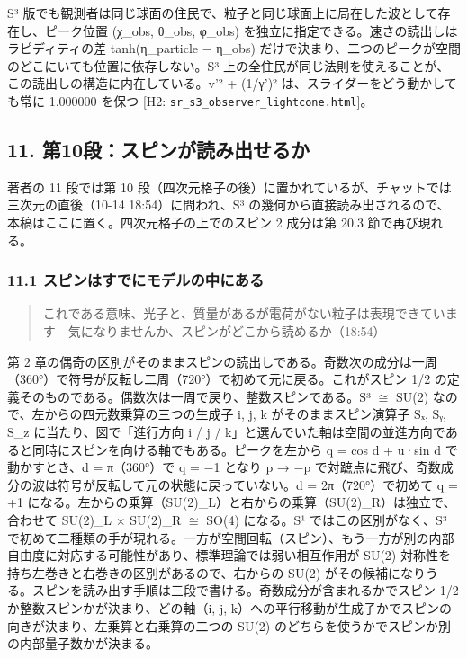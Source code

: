 \documentclass[
  a4paper,
]{ltjsarticle}
\begin{document}
S³
版でも観測者は同じ球面の住民で、粒子と同じ球面上に局在した波として存在し、ピーク位置
(χ\_obs, θ\_obs, φ\_obs)
を独立に指定できる。速さの読出しはラピディティの差 tanh(η\_particle −
η\_obs)
だけで決まり、二つのピークが空間のどこにいても位置に依存しない。S³
上の全住民が同じ法則を使えることが、この読出しの構造に内在している。v'²
+ (1/γ')² は、スライダーをどう動かしても常に 1.000000 を保つ {[}H2:
\texttt{sr\_\allowbreak{}s3\_\allowbreak{}observer\_\allowbreak{}lightcone.html}{]}。

\subsection{11.
第10段：スピンが読み出せるか}\label{ux7b2c10ux6bb5ux30b9ux30d4ux30f3ux304cux8aadux307fux51faux305bux308bux304b}

著者の 11 段では第 10
段（四次元格子の後）に置かれているが、チャットでは三次元の直後（10-14
18:54）に問われ、S³
の幾何から直接読み出されるので、本稿はここに置く。四次元格子の上でのスピン
2 成分は第 20.3 節で再び現れる。

\subsubsection{11.1
スピンはすでにモデルの中にある}\label{ux30b9ux30d4ux30f3ux306fux3059ux3067ux306bux30e2ux30c7ux30ebux306eux4e2dux306bux3042ux308b}

\begin{quote}
これである意味、光子と、質量があるが電荷がない粒子は表現できています　気になりませんか、スピンがどこから読めるか（18:54）
\end{quote}

第 2
章の偶奇の区別がそのままスピンの読出しである。奇数次の成分は一周（360°）で符号が反転し二周（720°）で初めて元に戻る。これがスピン
1/2 の定義そのものである。偶数次は一周で戻り、整数スピンである。S³
\(\cong\) SU(2) なので、左からの四元数乗算の三つの生成子 i, j, k
がそのままスピン演算子 Sₓ, Sᵧ, S\_z に当たり、図で「進行方向 i / j /
k」と選んでいた軸は空間の並進方向であると同時にスピンを向ける軸でもある。ピークを左から
q = cos d + u·sin d で動かすとき、d = π（360°）で q = −1 となり p → −p
で対蹠点に飛び、奇数成分の波は符号が反転して元の状態に戻っていない。d =
2π（720°）で初めて q = +1
になる。左からの乗算（SU(2)\_L）と右からの乗算（SU(2)\_R）は独立で、合わせて
SU(2)\_L × SU(2)\_R \(\cong\) SO(4) になる。S¹ ではこの区別がなく、S³
で初めて二種類の手が現れる。一方が空間回転（スピン）、もう一方が別の内部自由度に対応する可能性があり、標準理論では弱い相互作用が
SU(2) 対称性を持ち左巻きと右巻きの区別があるので、右からの SU(2)
がその候補になりうる。スピンを読み出す手順は三段で書ける。奇数成分が含まれるかでスピン
1/2 か整数スピンかが決まり、どの軸（i, j,
k）への平行移動が生成子かでスピンの向きが決まり、左乗算と右乗算の二つの
SU(2) のどちらを使うかでスピンか別の内部量子数かが決まる。
\end{document}
